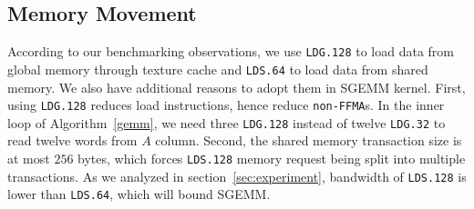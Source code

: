 \subsection{Memory Movement}
According to our benchmarking observations, we use {\tt LDG.128} to load data from global memory through texture cache
and {\tt LDS.64} to load data from shared memory.
We also have additional reasons to adopt them in SGEMM kernel.
First, using {\tt LDG.128} reduces load instructions, hence reduce {\tt non-FFMA}s. %
In the inner loop of Algorithm~\ref{gemm}, we need three {\tt LDG.128} instead of twelve {\tt LDG.32} to read twelve
words from $A$ column. Second, the shared memory transaction size is at most
$256$ bytes, which forces {\tt LDS.128} memory request being split into
multiple transactions.
As we analyzed in section~\ref{sec:experiment}, bandwidth of {\tt LDS.128} is lower than {\tt LDS.64}, which will bound
SGEMM.
